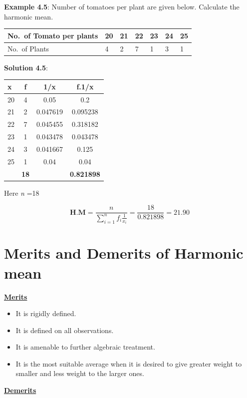 \documentclass[
]{book}
\begin{document}
\textbf{Example 4.5}: Number of tomatoes per plant are given below. Calculate
the harmonic mean.

\begin{longtable}[]{@{}lllllll@{}}
\toprule
No.~of Tomato per plants & 20 & 21 & 22 & 23 & 24 & 25 \\
\midrule
\endhead
No.~of Plants & 4 & 2 & 7 & 1 & 3 & 1 \\
\bottomrule
\end{longtable}

\textbf{Solution 4.5}:

\begin{longtable}[]{@{}lccc@{}}
\toprule
x & f & 1/x & f.1/x \\
\midrule
\endhead
20 & 4 & 0.05 & 0.2 \\
21 & 2 & 0.047619 & 0.095238 \\
22 & 7 & 0.045455 & 0.318182 \\
23 & 1 & 0.043478 & 0.043478 \\
24 & 3 & 0.041667 & 0.125 \\
25 & 1 & 0.04 & 0.04 \\
& \textbf{18} & & \textbf{0.821898} \\
\bottomrule
\end{longtable}

Here \emph{n} =18

\[\mathbf{\text{H.M}} = \frac{n}{\sum_{i = 1}^{n}{f_{i}\frac{1}{x_{i}}}} = \frac{18}{0.821898} = 21.90\]

\hypertarget{merits-and-demerits-of-harmonic-mean}{%
\section{Merits and Demerits of Harmonic mean}\label{merits-and-demerits-of-harmonic-mean}}

\underline{\textbf{Merits}}

\begin{itemize}
\item
  It is rigidly defined.
\item
  It is defined on all observations.
\item
  It is amenable to further algebraic treatment.
\item
  It is the most suitable average when it is desired to give greater
  weight to smaller and less weight to the larger ones.
\end{itemize}

\underline{\textbf{Demerits}}
\end{document}
